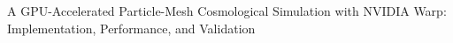 \documentclass[]{article}
\begin{document}
A GPU-Accelerated Particle-Mesh Cosmological Simulation with NVIDIA Warp: Implementation, Performance, and Validation
\end{document}
